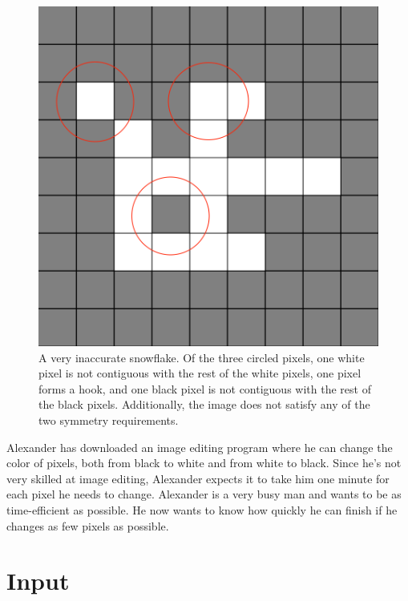 \begin{centering}
    \begin{figure}[h]
        \centering
        \includegraphics[scale=0.1]{invalid_example.png}
        \caption{A very inaccurate snowflake. Of the three circled pixels, one white pixel is not contiguous with the rest of the white pixels, one pixel forms a hook, and one black pixel is not contiguous with the rest of the black pixels. Additionally, the image does not satisfy any of the two symmetry requirements.}
        \label{fig:enter-label}
    \end{figure}
\end{centering}

\noindent
Alexander has downloaded an image editing program where he can change the color of pixels,
both from black to white and from white to black.
Since he's not very skilled at image editing, Alexander expects it to take him one minute
for each pixel he needs to change.
Alexander is a very busy man and wants to be as time-efficient as possible.
He now wants to know how quickly he can finish if he changes as few pixels as possible.

\section*{Input}

